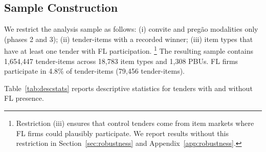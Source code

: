 \subsection{Sample Construction}

We restrict the analysis sample as follows: (i) convite and preg\~ao
modalities only (phases 2 and 3); (ii) tender-items with a recorded
winner; (iii) item types that have at least one tender with FL
participation.%
\footnote{Restriction (iii) ensures that control tenders come from item
markets where FL firms could plausibly participate. We report results
without this restriction in Section~\ref{sec:robustness} and
Appendix~\ref{app:robustness}.}
The resulting sample contains 1,654,447 tender-items across 18,783
item types and 1,308 PBUs. FL firms participate in 4.8\% of
tender-items (79,456 tender-items).

Table~\ref{tab:descstats} reports descriptive statistics for tenders
with and without FL presence.


